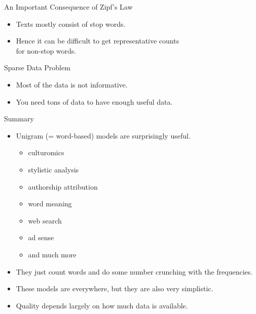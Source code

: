 \documentclass[professionalfonts, xcolor={usenames,svgnames,x11names,table}]{beamer}
\begin{document}
\begin{frame}{An Important Consequence of Zipf's Law}
    \begin{itemize}
        \item Texts mostly consist of stop words.
        \item Hence it can be difficult to get representative counts\\
            for non-stop words.
    \end{itemize}
    \begin{block}{Sparse Data Problem}
        \begin{itemize}
            \item Most of the data is not informative.
            \item You need tons of data to have enough useful data.
        \end{itemize}
    \end{block}
\end{frame}

\begin{frame}{Summary}
    \begin{itemize}
        \item Unigram (= word-based) models are surprisingly useful.
            \begin{itemize}
                \item culturomics
                \item stylistic analysis
                \item authorship attribution
                \item word meaning
                \item web search
                \item ad sense
                \item and much more
            \end{itemize}
        \item They just count words and do some number crunching with the frequencies.
        \item These models are everywhere, but they are also very simplistic.
        \item Quality depends largely on how much data is available.
    \end{itemize}
\end{frame}
\end{document}
